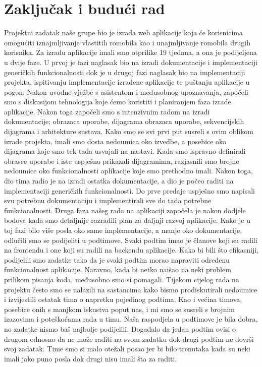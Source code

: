 \chapter{Zaključak i budući rad}
		
		
		Projektni zadatak naše grupe bio je izrada web aplikacije koja će korisnicima omogućiti iznajmljivanje vlastitih romobila kao i unajmljivanje romobila drugih korisnika. \newline
		Za izradu aplikacije imali smo otprilike 19 tjedana, a ona je podijeljena u dvije faze.
		U prvoj je fazi naglasak bio na izradi dokumentacije i implementaciji generičkih funkcionalnosti dok je u drugoj fazi naglasak bio na implementaciji projekta, ispitivanju implementacije izrađene aplikacije te puštanju aplikacije u pogon.
		Nakon uvodne vježbe s asistentom i međusobnog upoznavanja, započeli smo s diskusijom tehnologija koje ćemo koristiti i planiranjem faza izrade aplikacije. Nakon toga započeli smo s intenzivnim radom na izradi dokumentacije; obrazaca uporabe, dijagrama obrazaca uporabe, sekvencijskih dijagrama i arhitekture sustava.
		Kako smo se svi prvi put susreli s ovim oblikom izrade projekta, imali smo dosta nedoumica oko izvedbe, a posebice oko dijagrama koje smo tek tada usvajali na nastavi. Kada smo ispravno definirali obrasce uporabe i iste uspješno prikazali dijagramima, razjasnili smo brojne nedoumice oko funkcionalnosti aplikacije koje smo prethodno imali. Nakon toga, dio tima radio je na izradi ostatka dokumentacije, a dio je počeo raditi na implementaciji generičkih funkcionalnosti. Do prve predaje uspješno smo napisali svu potrebnu dokumentaciju i implementirali sve do tada potrebne funkcionalnosti. \newline
		Druga faza našeg rada na aplikaciji započela je nakon dodjele bodova kada smo detaljnije razradili plan za daljnji razvoj aplikacije. Kako je u toj fazi bilo više posla oko same implementacije, a manje oko dokumentacije, odlučili smo se podijeliti u podtimove. Svaki podtim imao je članove koji su radili na frontendu i one koji su radili na backendu aplikacije. Kako bi bili što efikasniji, podijelili smo zadatke tako da je svaki podtim morao napraviti određenu funkcionalnost aplikacije. Naravno, kada bi netko naišao na neki problem prilikom pisanja koda, međusobno smo si pomagali. Tijekom cijelog rada na projektu često smo se nalazili na sastancima kako bismo prodiskutirali nedoumice i izvijestili ostatak tima o napretku pojedinog podtima.\newline  
		Kao i većina timova, posebice onih s manjkom iskustva poput nas, i mi smo se susreli s brojnim izazovima i poteškoćama rada u timu. Naša raspodjela u podtimove je bila dobra, no zadatke nismo baš najbolje podijelili. Događalo da jedan podtim ovisi o drugom odnosno da ne može raditi na svom zadatku dok drugi podtim ne dovrši svoj zadatak. Time smo si malo otežali posao jer bi bilo trenutaka kada su neki imali jako puno posla dok drugi nisu imali šta za raditi. \newline
